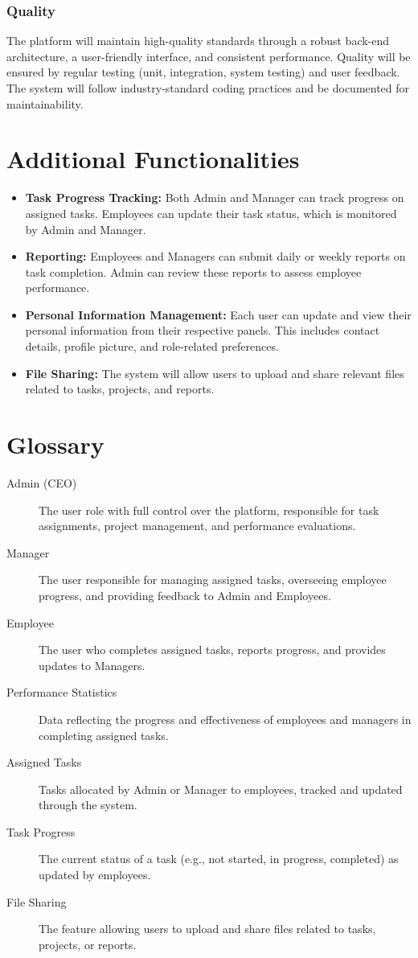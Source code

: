 \documentclass[a4paper,12pt]{article}
\begin{document}
\subsubsection{Quality}
The platform will maintain high-quality standards through a robust back-end architecture, a user-friendly interface, and consistent performance. Quality will be ensured by regular testing (unit, integration, system testing) and user feedback. The system will follow industry-standard coding practices and be documented for maintainability.

\section{Additional Functionalities}
\begin{itemize}
    \item \textbf{Task Progress Tracking:} Both Admin and Manager can track progress on assigned tasks. Employees can update their task status, which is monitored by Admin and Manager.
    \item \textbf{Reporting:} Employees and Managers can submit daily or weekly reports on task completion. Admin can review these reports to assess employee performance.
    \item \textbf{Personal Information Management:} Each user can update and view their personal information from their respective panels. This includes contact details, profile picture, and role-related preferences.
    \item \textbf{File Sharing:} The system will allow users to upload and share relevant files related to tasks, projects, and reports.
\end{itemize}

\newpage

\section{Glossary}
\begin{description}
    \item[Admin (CEO)] The user role with full control over the platform, responsible for task assignments, project management, and performance evaluations.
    \item[Manager] The user responsible for managing assigned tasks, overseeing employee progress, and providing feedback to Admin and Employees.
    \item[Employee] The user who completes assigned tasks, reports progress, and provides updates to Managers.
    \item[Performance Statistics] Data reflecting the progress and effectiveness of employees and managers in completing assigned tasks.
    \item[Assigned Tasks] Tasks allocated by Admin or Manager to employees, tracked and updated through the system.
    \item[Task Progress] The current status of a task (e.g., not started, in progress, completed) as updated by employees.
    \item[File Sharing] The feature allowing users to upload and share files related to tasks, projects, or reports.
\end{description}
\end{document}
